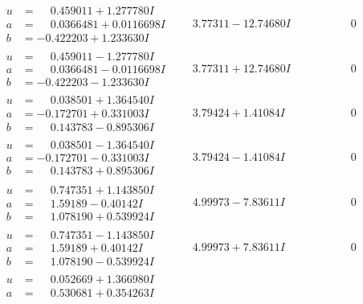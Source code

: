 \documentclass[1p]{elsarticle_modified}
\theoremstyle{definition}
\begin{document}
$$\begin{array}{c|c|c}
\begin{aligned}
u &= \phantom{-}0.459011 + 1.277780 I \\
a &= \phantom{-}0.0366481 + 0.0116698 I \\
b &= -0.422203 + 1.233630 I\end{aligned}
 & \phantom{-}3.77311 - 12.74680 I & \phantom{-0.000000 } 0 \\ \hline\begin{aligned}
u &= \phantom{-}0.459011 - 1.277780 I \\
a &= \phantom{-}0.0366481 - 0.0116698 I \\
b &= -0.422203 - 1.233630 I\end{aligned}
 & \phantom{-}3.77311 + 12.74680 I & \phantom{-0.000000 } 0 \\ \hline\begin{aligned}
u &= \phantom{-}0.038501 + 1.364540 I \\
a &= -0.172701 + 0.331003 I \\
b &= \phantom{-}0.143783 - 0.895306 I\end{aligned}
 & \phantom{-}3.79424 + 1.41084 I & \phantom{-0.000000 } 0 \\ \hline\begin{aligned}
u &= \phantom{-}0.038501 - 1.364540 I \\
a &= -0.172701 - 0.331003 I \\
b &= \phantom{-}0.143783 + 0.895306 I\end{aligned}
 & \phantom{-}3.79424 - 1.41084 I & \phantom{-0.000000 } 0 \\ \hline\begin{aligned}
u &= \phantom{-}0.747351 + 1.143850 I \\
a &= \phantom{-}1.59189 - 0.40142 I \\
b &= \phantom{-}1.078190 + 0.539924 I\end{aligned}
 & \phantom{-}4.99973 - 7.83611 I & \phantom{-0.000000 } 0 \\ \hline\begin{aligned}
u &= \phantom{-}0.747351 - 1.143850 I \\
a &= \phantom{-}1.59189 + 0.40142 I \\
b &= \phantom{-}1.078190 - 0.539924 I\end{aligned}
 & \phantom{-}4.99973 + 7.83611 I & \phantom{-0.000000 } 0 \\ \hline\begin{aligned}
u &= \phantom{-}0.052669 + 1.366980 I \\
a &= \phantom{-}0.530681 + 0.354263 I \\

\end{aligned}
\end{array}$$
\end{document}
